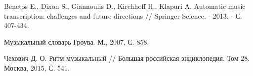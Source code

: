 
\begingroup
\renewcommand{\section}[2]{}
\begin{thebibliography}{}
	
Benetos E., Dixon S., Giannoulis D., Kirchhoff H., Klapuri A. Automatic music transcription: challenges and future directions // Springer Science. - 2013. - С. 407-434.

Музыкальный словарь Гроува. М., 2007, С. 858.

Чехович Д. О. Ритм музыкальный // Большая российская энциклопедия. Том 28. Москва, 2015, С. 541.

\end{thebibliography}
\endgroup